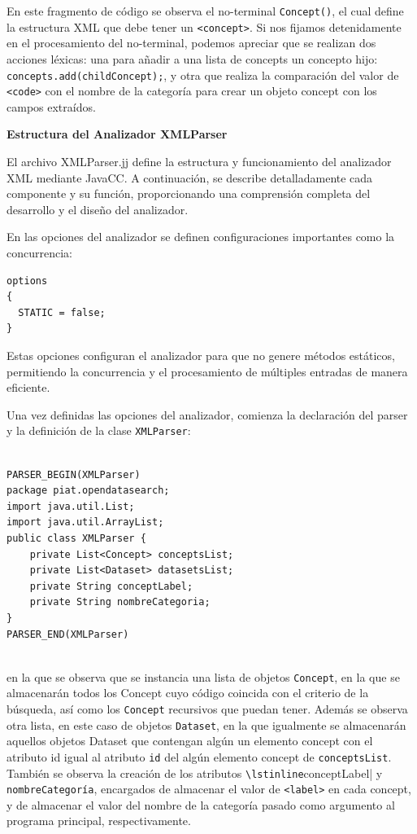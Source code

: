 En este fragmento de código se observa el no-terminal \lstinline|Concept()|, el cual define la estructura XML que debe tener un \lstinline|<concept>|. Si nos fijamos detenidamente en el procesamiento del no-terminal, podemos apreciar que se realizan dos acciones léxicas: una para añadir a una lista de concepts un concepto hijo: \lstinline|concepts.add(childConcept);|, y otra que realiza la comparación del valor de \lstinline|<code>| con el nombre de la categoría para crear un objeto concept con los campos extraídos.

\phantom{text}

\noindent \textbf{Estructura del Analizador XMLParser}

\phantom{text}

\noindent El archivo XMLParser.jj define la estructura y funcionamiento del analizador XML mediante JavaCC. A continuación, se describe detalladamente cada componente y su función, proporcionando una comprensión completa del desarrollo y el diseño del analizador.

En las opciones del analizador se definen configuraciones importantes como la concurrencia:

\lstset{inputencoding=utf8/latin1}
\begin{lstlisting}
options
{
  STATIC = false;
}
\end{lstlisting}

Estas opciones configuran el analizador para que no genere métodos estáticos, permitiendo la concurrencia y el procesamiento de múltiples entradas de manera eficiente.

Una vez definidas las opciones del analizador, comienza la declaración del parser y la definición de la clase \lstinline|XMLParser|:

\lstset{inputencoding=utf8/latin1}
\begin{lstlisting}
    
PARSER_BEGIN(XMLParser)
package piat.opendatasearch;
import java.util.List;
import java.util.ArrayList;
public class XMLParser {
    private List<Concept> conceptsList;
    private List<Dataset> datasetsList;
    private String conceptLabel;
    private String nombreCategoria;
}
PARSER_END(XMLParser)
    
\end{lstlisting}

en la que se observa que se instancia una lista de objetos \lstinline|Concept|, en la que se almacenarán todos los Concept cuyo código coincida con el criterio de la búsqueda, así como los \lstinline|Concept| recursivos que puedan tener.
Además se observa otra lista, en este caso de objetos \lstinline|Dataset|, en la que igualmente se almacenarán aquellos objetos Dataset que contengan algún un elemento concept con el atributo id igual al atributo \lstinline|id| del algún elemento concept de \lstinline|conceptsList|.
También se observa la creación de los atributos \lstinline|\lstinline|conceptLabel| y \lstinline|nombreCategoría|, encargados de almacenar el valor de \lstinline|<label>| en cada concept, y de almacenar el valor del nombre de la categoría pasado como argumento al programa principal, respectivamente.


